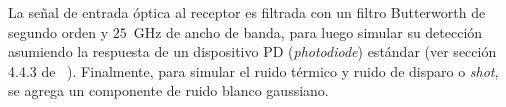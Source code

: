 La señal de entrada óptica al receptor es filtrada con un filtro Butterworth de segundo orden y $25$~GHz de ancho de banda, para luego simular su detección asumiendo la respuesta de un dispositivo PD (\textit{photodiode}) estándar (ver sección 4.4.3 de ~\cite{Agrawal:xx}).
Finalmente, para simular el ruido térmico y ruido de disparo o \textit{shot}, se agrega un componente de ruido blanco gaussiano.


